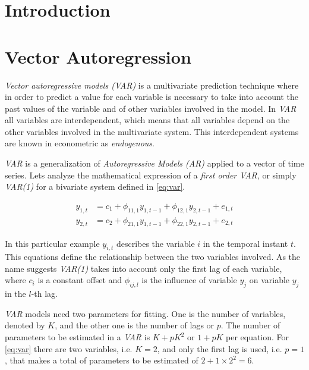 
\chapter{Introduction}
\label{ch:introduction}

\chapter{Vector Autoregression}
\label{ch:vector-autoregression}

\textit{Vector autoregressive models (VAR)} is a multivariate
prediction technique where in order to predict a value for each
variable is necessary to take into account the past values of the
variable and of other variables involved in the model. In \textit{VAR}
all variables are interdependent, which means that all variables
depend on the other variables involved in the multivariate system.
This interdependent systems are known in econometric as
\textit{endogenous}.

\textit{VAR} is a generalization of \textit{Autoregressive Models
  (AR)} applied to a vector of time series. Lets analyze the
mathematical expression of a \textit{first order VAR}, or simply
\textit{VAR(1)} for a bivariate system defined in \autoref{eq:var}.

\begin{equation}
  \begin{aligned}
    \label{eq:var}
    y_{1,t} & = c_1 + \phi_{11,1} y_{1,t-1} + \phi_{12,1} y_{2,t-1} +
    e_{1,t} \\
    y_{2,t} & = c_2 + \phi_{21,1} y_{1,t-1} + \phi_{22,1} y_{2,t-1} +
    e_{2,t} 
  \end{aligned}
\end{equation}

In this particular example $y_{i, t}$ describes the variable $i$ in
the temporal instant $t$. This equations define the relationship
between the two variables involved. As the name suggests
\textit{VAR(1)} takes into account only the first lag of each
variable, where $c_i$ is a constant offset and $\phi_{ij,l}$ is the
influence of variable $y_j$ on variable $y_j$ in the $l$-th lag.

\textit{VAR} models need two parameters for fitting. One is the number
of variables, denoted by $K$, and the other one is the number of lags
or $p$. The number of parameters to be estimated in a \textit{VAR} is
$K + p K^2$ or $1 + p K$ per equation. For \autoref{eq:var} there are
two variables, i.e. $K=2$, and only the first lag is used, i.e. $p=1$,
that makes a total of parameters to be estimated of
$2 + 1 \times 2^2 = 6$.

